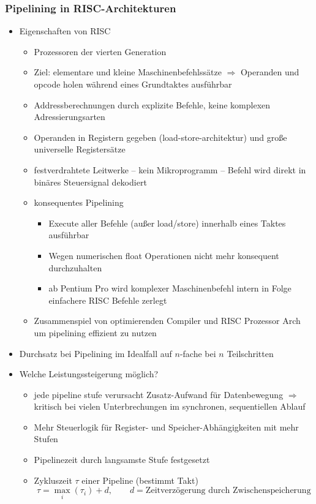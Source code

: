 \subsubsection{Pipelining in RISC-Architekturen}
\begin{itemize}
	\item
		Eigenschaften von RISC
		\begin{itemize}
			\item
				Prozessoren der vierten Generation
			\item
				Ziel: elementare und kleine Maschinenbefehlssätze $\Rightarrow$ Operanden und opcode holen während eines Grundtaktes ausführbar
			\item
				Addressberechnungen durch explizite Befehle, keine komplexen Adressierungsarten
			\item
				Operanden in Registern gegeben (load-store-architektur) und große universelle Registersätze
			\item
				festverdrahtete Leitwerke -- kein Mikroprogramm -- Befehl wird direkt in binäres Steuersignal dekodiert
			\item
				konsequentes Pipelining
				\begin{itemize}
					\item
						Execute aller Befehle (außer load/store) innerhalb eines Taktes ausführbar
					\item
						Wegen numerischen float Operationen nicht mehr konsequent durchzuhalten
					\item
						ab Pentium Pro wird komplexer Maschinenbefehl intern in Folge einfachere RISC Befehle zerlegt
				\end{itemize}
			\item
				Zusammenspiel von optimierenden Compiler und RISC Prozessor Arch um pipelining effizient zu nutzen

		\end{itemize}
	\item
		Durchsatz bei Pipelining im Idealfall auf $n$-fache bei $n$ Teilschritten
	\item
		Welche Leistungssteigerung möglich? 
		\begin{itemize}
			\item
				jede pipeline stufe verursacht Zusatz-Aufwand für Datenbewegung $\Rightarrow$ kritisch bei vielen Unterbrechungen im synchronen, sequentiellen Ablauf
			\item
				Mehr Steuerlogik für Register- und Speicher-Abhängigkeiten mit mehr Stufen
			\item
				Pipelinezeit durch langsamste Stufe festgesetzt
			\item
				Zykluszeit $\tau$ einer Pipeline (bestimmt Takt)
				$$
				\tau = \max_i(\tau_i) + d, \qquad d = \text{Zeitverzögerung durch Zwischenspeicherung}$$


\end{itemize}
\end{itemize}
